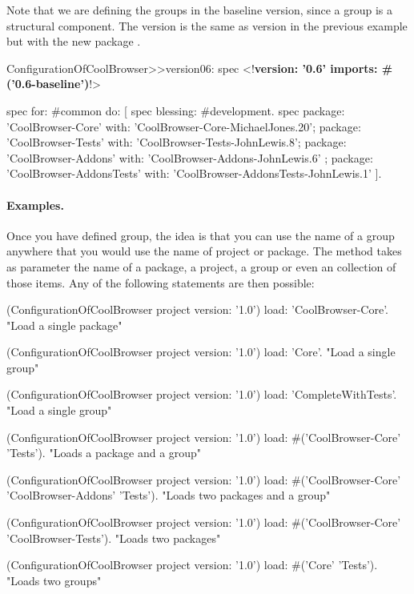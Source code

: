 \documentclass[a4paper,10pt,twoside]{book}
\begin{document}
 
Note that we are defining the groups in the baseline version, since a group is a structural component. The version  is the same as version in the previous example but with the new package .
 
\begin{code}{}
ConfigurationOfCoolBrowser>>version06: spec 
	<!\textbf{version: '0.6' imports: \#('0.6-baseline')}!>
	
	spec for: #common do: [
		spec blessing: #development.
		spec 
			package: 'CoolBrowser-Core' with: 'CoolBrowser-Core-MichaelJones.20';
			package: 'CoolBrowser-Tests' with: 'CoolBrowser-Tests-JohnLewis.8';
			package: 'CoolBrowser-Addons' with: 'CoolBrowser-Addons-JohnLewis.6' ;
			package: 'CoolBrowser-AddonsTests' with: 'CoolBrowser-AddonsTests-JohnLewis.1' ].
\end{code}
 

\paragraph{Examples.} Once you have defined group, the idea is that you can use the name of a group anywhere that you would use the name of project or package. The   method takes as parameter the name of a package, a project, a group or even an collection of those items.  Any of the following statements are then possible:

 
\begin{code}{}
(ConfigurationOfCoolBrowser project version: '1.0') load: 'CoolBrowser-Core'. 
	"Load a single package"

(ConfigurationOfCoolBrowser project version: '1.0') load: 'Core'. 
	"Load a single group"

(ConfigurationOfCoolBrowser project version: '1.0') load: 'CompleteWithTests'.  
	"Load a single group"
 
(ConfigurationOfCoolBrowser project version: '1.0') 
	load: #('CoolBrowser-Core' 'Tests').   
	"Loads a package and a group"

(ConfigurationOfCoolBrowser project version: '1.0') load: #('CoolBrowser-Core' 'CoolBrowser-Addons' 'Tests'). 
	"Loads two packages and a group" 

 (ConfigurationOfCoolBrowser project version: '1.0') load: #('CoolBrowser-Core' 'CoolBrowser-Tests').
	"Loads two packages"
  
(ConfigurationOfCoolBrowser project version: '1.0') load: #('Core' 'Tests'). 
	"Loads two groups"
\end{code}
\end{document}

